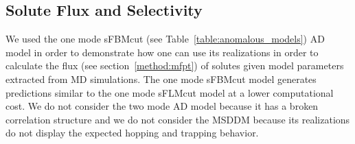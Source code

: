 \documentclass[aps,pre,preprint,groupedaddress,longbibliography]{revtex4-2}
\begin{document}
  
%  
  
  \subsection{Solute Flux and Selectivity}\label{section:mfpt}
  
  We used the one mode sFBMcut (see Table~\ref{table:anomalous_models}) AD
  model in order to demonstrate how one can use its realizations in order 
  to calculate the flux (see section~\ref{method:mfpt}) of solutes given 
  model parameters extracted from MD simulations. The one mode sFBMcut model
  generates predictions similar to the one mode sFLMcut model at a lower 
  computational cost. We do not consider the two mode AD model because it 
  has a broken correlation structure and we do not consider the MSDDM because
  its realizations do not display the expected hopping and trapping behavior. 
\end{document}
